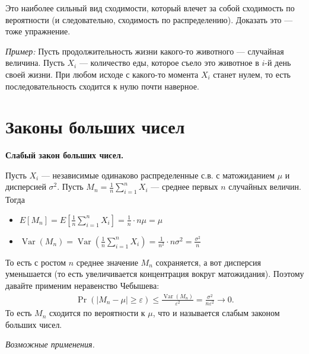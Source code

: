 \documentclass[12pt]{article}
\newcommand\eps{\varepsilon}
\DeclareMathOperator{\Var}{Var}
\begin{document}
Это наиболее сильный вид сходимости, который влечет за собой сходимость по вероятности (и следовательно, сходимость по распределению). Доказать это --- тоже упражнение.

\emph{Пример:} Пусть продолжительность жизни какого-то животного --- случайная величина. Пусть $X_i$ --- количество еды, которое съело это животное в $i$-й день своей жизни. При любом исходе с какого-то момента $X_i$ станет нулем, то есть последовательность сходится к нулю почти наверное.

\section{Законы больших чисел}

\textbf{Слабый закон больших чисел.}

Пусть $X_i$ --- независимые одинаково распределенные с.в. с матожиданием $\mu$ и дисперсией $\sigma^2$. Пусть $M_n = \frac{1}{n} \sum_{i = 1}^n X_i$ --- среднее первых $n$ случайных величин. Тогда
\begin{itemize}
  \item $E[M_n] = E[\frac{1}{n} \sum_{i = 1}^n X_i] = \frac{1}{n} \cdot n\mu = \mu$
  \item $\Var(M_n) = \Var(\frac{1}{n} \sum_{i = 1}^n X_i) = \frac{1}{n^2} \cdot n\sigma^2 = \frac{\sigma^2}{n}$
\end{itemize}
То есть с ростом $n$ среднее значение $M_n$ сохраняется, а вот дисперсия уменьшается (то есть увеличивается концентрация вокруг матожидания). Поэтому давайте применим неравенство Чебышева:
\begin{align*}
  \Pr(|M_n - \mu| \ge \eps) \le \frac{\Var(M_n)}{\eps^2} = \frac{\sigma^2}{n\eps^2} \to 0.
\end{align*}
То есть $M_n$ сходится по вероятности к $\mu$, что и называется слабым законом больших чисел.
\begin{center}
\end{center}

\emph{Возможные применения.}
\end{document}
